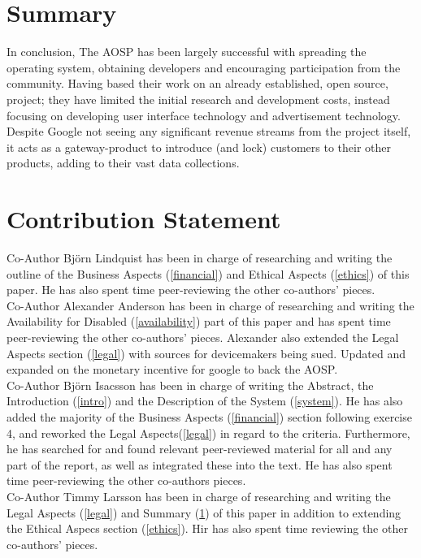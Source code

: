 \documentclass[conference]{IEEEtran}
\begin{document}
\section{Summary}
\label{summary}

In conclusion, The AOSP has been largely successful with spreading the operating system, obtaining developers and encouraging participation from the community. Having based their work on an already established, open source, project; they have limited the initial research and development costs, instead focusing on developing user interface technology and advertisement technology. Despite Google not seeing any significant revenue streams from the project itself, it acts as a gateway-product to introduce (and lock) customers to their other products, adding to their vast data collections.


\section{Contribution Statement}
\label{contribution}

Co-Author Björn Lindquist has been in charge of researching and writing the outline of the Business Aspects (\ref{financial}) and Ethical Aspects (\ref{ethics}) of this paper. He has also spent time peer-reviewing the other co-authors' pieces.
\\Co-Author Alexander Anderson has been in charge of researching and writing the Availability for Disabled (\ref{availability}) part of this paper and has spent time peer-reviewing the other co-authors' pieces. Alexander also extended the Legal Aspects section (\ref{legal}) with sources for devicemakers being sued. Updated and expanded on the monetary incentive for google to back the AOSP.
\\Co-Author Björn Isacsson has been in charge of writing the Abstract, the Introduction (\ref{intro}) and the Description of the System (\ref{system}). He has also added the majority of the Business Aspects (\ref{financial}) section following exercise 4, and reworked the Legal Aspects(\ref{legal}) in regard to the criteria. Furthermore, he has searched for and found relevant peer-reviewed material for all and any part of the report, as well as integrated these into the text. He has also spent time peer-reviewing the other co-authors pieces. 
\\Co-Author Timmy Larsson has been in charge of researching and writing the Legal Aspects (\ref{legal}) and Summary (\ref{summary}) of this paper in addition to extending the Ethical Aspecs section (\ref{ethics}). Hir has also spent time reviewing the other co-authors' pieces.
\end{document}
